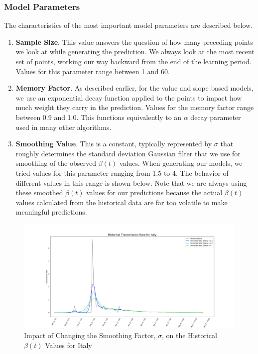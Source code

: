 \documentclass[11pt]{article}
\begin{document}
\subsubsection{Model Parameters}
The characteristics of the most important model parameters are described below.
\begin{enumerate}
    \item \textbf{Sample Size}. This value answers the question of how many preceding points we look at while generating the prediction. We always look at the most recent set of points, working our way backward from the end of the learning period. Values for this parameter range between 1 and 60.
    \item \textbf{Memory Factor}. As described earlier, for the value and slope based models, we use an exponential decay function applied to the points to impact how much weight they carry in the prediction. Values for the memory factor range between 0.9 and 1.0. This functions equivalently to an $\alpha$ decay parameter used in many other algorithms.
    \item \textbf{Smoothing Value}. This is a constant, typically represented by $\sigma$ that roughly determines the standard deviation Gaussian filter that we use for smoothing of the observed $\beta(t)$ values. When generating our models, we tried values for this parameter ranging from 1.5 to 4. The behavior of different values in this range is shown below. Note that we are always using these smoothed $\beta(t)$ values for our predictions because the actual $\beta(t)$ values calculated from the historical data are far too volatile to make meaningful predictions.
\end{enumerate}

\begin{figure}[h]
    \includegraphics[width=16cm]{images/ItalyTransmission.png}
    \centering
    \caption{Impact of Changing the Smoothing Factor, $\sigma$, on the Historical $\beta(t)$ Values for Italy}
    \label{fig:italy-transmission}
\end{figure}
\end{document}
